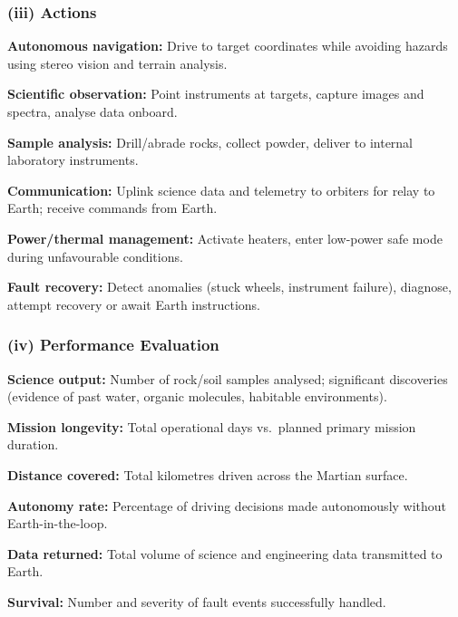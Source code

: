 \documentclass[12pt, a4paper]{article}
\begin{document}
\subsubsection*{(iii) Actions}

\begin{keypoints}
  \item \textbf{Autonomous navigation:} Drive to target coordinates while avoiding hazards using stereo vision and terrain analysis.
  \item \textbf{Scientific observation:} Point instruments at targets, capture images and spectra, analyse data onboard.
  \item \textbf{Sample analysis:} Drill/abrade rocks, collect powder, deliver to internal laboratory instruments.
  \item \textbf{Communication:} Uplink science data and telemetry to orbiters for relay to Earth; receive commands from Earth.
  \item \textbf{Power/thermal management:} Activate heaters, enter low-power safe mode during unfavourable conditions.
  \item \textbf{Fault recovery:} Detect anomalies (stuck wheels, instrument failure), diagnose, attempt recovery or await Earth instructions.
\end{keypoints}

\subsubsection*{(iv) Performance Evaluation}

\begin{keypoints}
  \item \textbf{Science output:} Number of rock/soil samples analysed; significant discoveries (evidence of past water, organic molecules, habitable environments).
  \item \textbf{Mission longevity:} Total operational days vs.\ planned primary mission duration.
  \item \textbf{Distance covered:} Total kilometres driven across the Martian surface.
  \item \textbf{Autonomy rate:} Percentage of driving decisions made autonomously without Earth-in-the-loop.
  \item \textbf{Data returned:} Total volume of science and engineering data transmitted to Earth.
  \item \textbf{Survival:} Number and severity of fault events successfully handled.
\end{keypoints}
\end{document}
